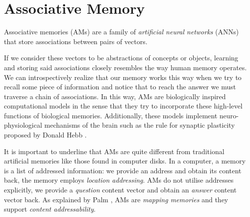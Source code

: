 \documentclass[runningheads]{llncs}
\begin{document}
\section{Associative Memory}
\label{sec:assomem}
Associative memories (AMs) are a family of \textit{artificial neural networks} (ANNs) that store associations between pairs of vectors.

If we consider these vectors to be abstractions of concepts or objects, learning and storing said associations closely resembles the way human memory operates. We can introspectively realize that our memory works this way when we try to recall some piece of information and notice that to reach the answer we must traverse a chain of associations. In this way, AMs are biologically inspired computational models in the sense that they try to incorporate these high-level functions of biological memories. Additionally, these models implement neuro-physiological mechanisms of the brain such as the rule for synaptic plasticity proposed by Donald Hebb \cite{hebb2005organization}.

It is important to underline that AMs are quite different from traditional artificial memories like those found in computer disks. In a computer, a memory is a list of addressed information: we provide an address and obtain its content back, the memory employs \textit{location addressing}. AMs do not utilise addresses explicitly, we provide a \textit{question} content vector and obtain an \textit{answer} content vector back.  As explained by Palm \cite{PALM1982145}, AMs are \textit{mapping memories} and they support \textit{content addressability}.
\end{document}
